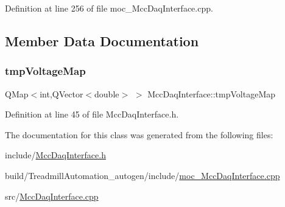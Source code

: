 Definition at line 256 of file moc\+\_\+\+Mcc\+Daq\+Interface.\+cpp.



\subsection{Member Data Documentation}
\mbox{\label{class_mcc_daq_interface_ae1c7212ef6250f2900a21029a8506a3e}} 
\subsubsection{\texorpdfstring{tmp\+Voltage\+Map}{tmpVoltageMap}}
{\footnotesize\ttfamily Q\+Map$<$int,Q\+Vector$<$double$>$ $>$ Mcc\+Daq\+Interface\+::tmp\+Voltage\+Map}



Definition at line 45 of file Mcc\+Daq\+Interface.\+h.



The documentation for this class was generated from the following files\+:\begin{DoxyCompactItemize}
\item 
include/\hyperlink{_mcc_daq_interface_8h}{Mcc\+Daq\+Interface.\+h}\item 
build/\+Treadmill\+Automation\+\_\+autogen/include/\hyperlink{moc___mcc_daq_interface_8cpp}{moc\+\_\+\+Mcc\+Daq\+Interface.\+cpp}\item 
src/\hyperlink{_mcc_daq_interface_8cpp}{Mcc\+Daq\+Interface.\+cpp}\end{DoxyCompactItemize}
